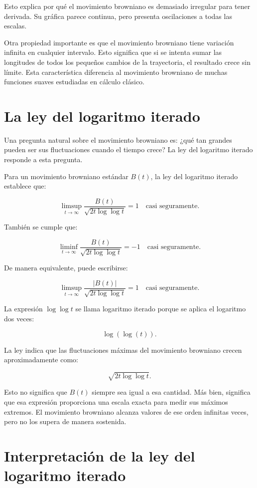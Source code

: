 \documentclass[12pt]{article}
\begin{document}
Esto explica por qué el movimiento browniano es demasiado irregular para tener derivada. Su gráfica parece continua, pero presenta oscilaciones a todas las escalas.

Otra propiedad importante es que el movimiento browniano tiene variación infinita en cualquier intervalo. Esto significa que si se intenta sumar las longitudes de todos los pequeños cambios de la trayectoria, el resultado crece sin límite. Esta característica diferencia al movimiento browniano de muchas funciones suaves estudiadas en cálculo clásico.

\section{La ley del logaritmo iterado}

Una pregunta natural sobre el movimiento browniano es: ¿qué tan grandes pueden ser sus fluctuaciones cuando el tiempo crece? La ley del logaritmo iterado responde a esta pregunta.

Para un movimiento browniano estándar $B(t)$, la ley del logaritmo iterado establece que:

\[
\limsup_{t\to\infty}
\frac{B(t)}
{\sqrt{2t\log\log t}}
=1
\quad \text{casi seguramente}.
\]

También se cumple que:

\[
\liminf_{t\to\infty}
\frac{B(t)}
{\sqrt{2t\log\log t}}
=-1
\quad \text{casi seguramente}.
\]

De manera equivalente, puede escribirse:

\[
\limsup_{t\to\infty}
\frac{|B(t)|}
{\sqrt{2t\log\log t}}
=1
\quad \text{casi seguramente}.
\]

La expresión $\log\log t$ se llama logaritmo iterado porque se aplica el logaritmo dos veces:

\[
\log(\log(t)).
\]

La ley indica que las fluctuaciones máximas del movimiento browniano crecen aproximadamente como:

\[
\sqrt{2t\log\log t}.
\]

Esto no significa que $B(t)$ siempre sea igual a esa cantidad. Más bien, significa que esa expresión proporciona una escala exacta para medir sus máximos extremos. El movimiento browniano alcanza valores de ese orden infinitas veces, pero no los supera de manera sostenida.

\section{Interpretación de la ley del logaritmo iterado}
\end{document}

